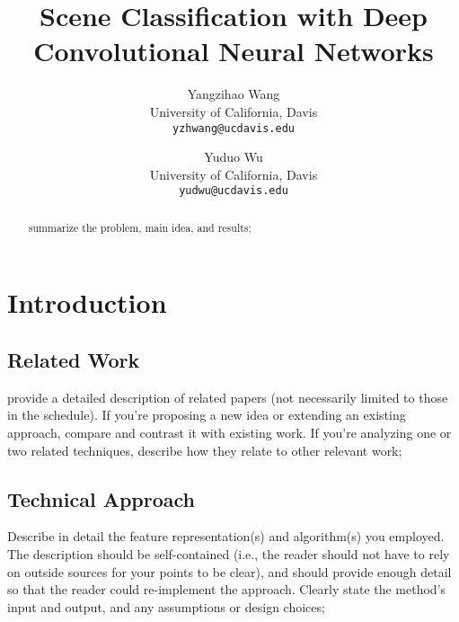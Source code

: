 \documentclass[10pt,twocolumn,letterpaper]{article}
\begin{document}
\title{Scene Classification with Deep Convolutional Neural Networks}

\author{Yangzihao Wang\\
University of California, Davis\\
{\tt\small yzhwang@ucdavis.edu}
\and
Yuduo Wu\\
University of California, Davis\\
{\tt\small yudwu@ucdavis.edu}
}

\maketitle

\begin{abstract}
summarize the problem, main idea, and results;
\end{abstract}

\section{Introduction}

\subsection{Related Work}

provide a detailed description of related papers (not necessarily limited to
those in the schedule).  If you're proposing a new idea or extending an existing
approach, compare and contrast it with existing work.  If you're analyzing one
or two related techniques, describe how they relate to other relevant work;
~\cite{Li:2010:OBA, Lazebnik:2006:BBF, Zhou:2014:LDF, Krizhevsky:2012:ICD, Quattoni:2009:RIS, Uijlings:2013:SSO}

\subsection{Technical Approach}

Describe in detail the feature representation(s) and algorithm(s) you employed.
The description should be self-contained (i.e., the reader should not have to
rely on outside sources for your points to be clear), and should provide enough
detail so that the reader could re-implement the approach.  Clearly state the
method's input and output, and any assumptions or design choices;
\end{document}
